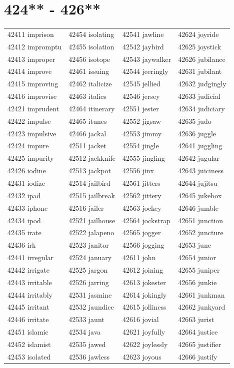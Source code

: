 \documentclass[10pt, oneside]{book}
\begin{document}
\begin{table}
	\centering
	\section*{424** - 426**}
	\begin{tabular}{l l l l}
42411 imprison &42454 isolating &42541 jawline &42624 joyride\\
42412 impromptu &42455 isolation &42542 jaybird &42625 joystick\\
42413 improper &42456 isotope &42543 jaywalker &42626 jubilance\\
42414 improve &42461 issuing &42544 jeeringly &42631 jubilant\\
42415 improving &42462 italicize &42545 jellied &42632 judgingly\\
42416 improvise &42463 italics &42546 jersey &42633 judicial\\
42421 imprudent &42464 itinerary &42551 jester &42634 judiciary\\
42422 impulse &42465 itunes &42552 jigsaw &42635 judo\\
42423 impulsive &42466 jackal &42553 jimmy &42636 juggle\\
42424 impure &42511 jacket &42554 jingle &42641 juggling\\
42425 impurity &42512 jackknife &42555 jingling &42642 jugular\\
42426 iodine &42513 jackpot &42556 jinx &42643 juiciness\\
42431 iodize &42514 jailbird &42561 jitters &42644 jujitsu\\
42432 ipad &42515 jailbreak &42562 jittery &42645 jukebox\\
42433 iphone &42516 jailer &42563 jockey &42646 jumble\\
42434 ipod &42521 jailhouse &42564 jockstrap &42651 junction\\
42435 irate &42522 jalapeno &42565 jogger &42652 juncture\\
42436 irk &42523 janitor &42566 jogging &42653 june\\
42441 irregular &42524 january &42611 john &42654 junior\\
42442 irrigate &42525 jargon &42612 joining &42655 juniper\\
42443 irritable &42526 jarring &42613 jokester &42656 junkie\\
42444 irritably &42531 jasmine &42614 jokingly &42661 junkman\\
42445 irritant &42532 jaundice &42615 jolliness &42662 junkyard\\
42446 irritate &42533 jaunt &42616 jovial &42663 jurist\\
42451 islamic &42534 java &42621 joyfully &42664 justice\\
42452 islamist &42535 jawed &42622 joylessly &42665 justifier\\
42453 isolated &42536 jawless &42623 joyous &42666 justify\\
	\end{tabular}
 \end{table}
\clearpage
\end{document}
